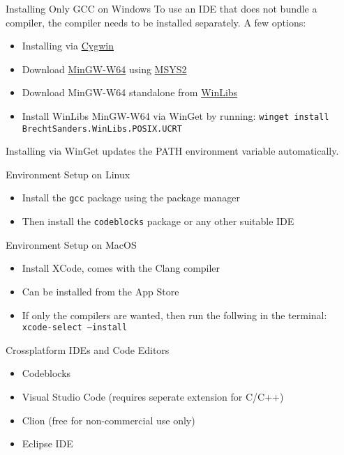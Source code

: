 \documentclass[12pt, aspectratio=169]{beamer}
\begin{document}
    \begin{frame}{Installing Only GCC on Windows}
        To use an IDE that does not bundle a compiler, the compiler needs to be installed separately. A few options:
        \begin{itemize}
            \item Installing via \href{https://www.cygwin.com/}{Cygwin}
            \item Download \href{https://www.mingw-w64.org/}{MinGW-W64} using \href{https://www.msys2.org/}{MSYS2}
            \item Download MinGW-W64 standalone from \href{https://winlibs.com/}{WinLibs}
            \item Install WinLibs MinGW-W64 via WinGet by running: \texttt{winget~install BrechtSanders.WinLibs.POSIX.UCRT}
        \end{itemize}

        Installing via WinGet updates the PATH environment variable automatically.
    \end{frame}

    \begin{frame}{Environment Setup on Linux}
        \begin{itemize}
            \item Install the \texttt{gcc} package using the package manager
            \item Then install the \texttt{codeblocks} package or any other suitable IDE
        \end{itemize}
    \end{frame}

    \begin{frame}{Environment Setup on MacOS}
        \begin{itemize}
            \item Install XCode, comes with the Clang compiler
            \item Can be installed from the App Store
            \item If only the compilers are wanted, then run the follwing in the terminal: \texttt{xcode-select~--install}
        \end{itemize}
    \end{frame}

    \begin{frame}{Crossplatform IDEs and Code Editors}
        \begin{itemize}
            \item Codeblocks
            \item Visual Studio Code (requires seperate extension for C/C++)
            \item Clion (free for non-commercial use only)
            \item Eclipse IDE
        \end{itemize}
    \end{frame}
\end{document}
